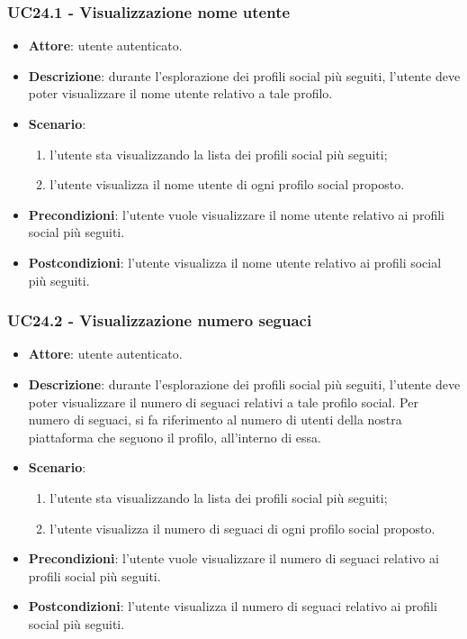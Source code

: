 \subsubsection{UC24.1 - Visualizzazione nome utente}
\begin{itemize}
    \item \textbf{Attore}: utente autenticato.
    \item \textbf{Descrizione}: durante l'esplorazione dei profili social più seguiti,
     l'utente deve poter visualizzare il nome utente relativo a tale profilo.
    \item \textbf{Scenario}:
    \begin{enumerate}
        \item l'utente sta visualizzando la lista dei profili social più seguiti;
        \item l'utente visualizza il nome utente di ogni profilo social proposto.
    \end{enumerate}
    \item \textbf{Precondizioni}: l'utente vuole visualizzare il nome utente relativo ai  profili social più seguiti.
    \item \textbf{Postcondizioni}: l'utente visualizza il nome utente relativo ai  profili social più seguiti.
\end{itemize}

\subsubsection{UC24.2 - Visualizzazione numero seguaci}
\begin{itemize}
    \item \textbf{Attore}: utente autenticato.
    \item \textbf{Descrizione}: durante l'esplorazione dei profili social più seguiti,
    l'utente deve poter visualizzare il numero di seguaci relativi a tale profilo social.
    Per numero di seguaci, si fa riferimento al numero di utenti della nostra piattaforma
    che seguono il profilo, all'interno di essa.
    \item \textbf{Scenario}:
    \begin{enumerate}
        \item l'utente sta visualizzando la lista dei profili social più seguiti;
        \item l'utente visualizza il numero di seguaci di ogni profilo social proposto.
    \end{enumerate}
    \item \textbf{Precondizioni}: l'utente vuole visualizzare il numero di seguaci relativo ai  profili social più seguiti.
    \item \textbf{Postcondizioni}: l'utente visualizza il numero di seguaci relativo ai  profili social più seguiti.
\end{itemize}

